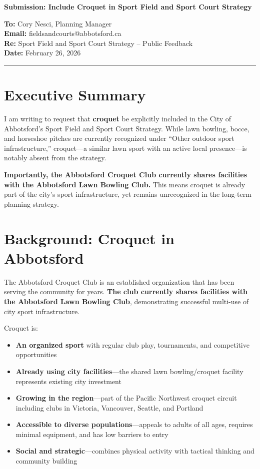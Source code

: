 \documentclass[11pt,letterpaper]{article}
\begin{document}
\begin{center}
{\Large \textbf{Submission: Include Croquet in Sport Field and Sport Court Strategy}}
\end{center}

\noindent
\textbf{To:} Cory Nesci, Planning Manager \\
\textbf{Email:} fieldsandcourts@abbotsford.ca \\
\textbf{Re:} Sport Field and Sport Court Strategy -- Public Feedback \\
\textbf{Date:} February 26, 2026

\vspace{0.5cm}
\noindent\rule{\textwidth}{0.4pt}
\vspace{0.5cm}

\section*{Executive Summary}

I am writing to request that \textbf{croquet} be explicitly included in the City of Abbotsford's Sport Field and Sport Court Strategy. While lawn bowling, bocce, and horseshoe pitches are currently recognized under ``Other outdoor sport infrastructure,'' croquet---a similar lawn sport with an active local presence---is notably absent from the strategy.

\textbf{Importantly, the Abbotsford Croquet Club currently shares facilities with the Abbotsford Lawn Bowling Club.} This means croquet is already part of the city's sport infrastructure, yet remains unrecognized in the long-term planning strategy.

\section*{Background: Croquet in Abbotsford}

The Abbotsford Croquet Club is an established organization that has been serving the community for years. \textbf{The club currently shares facilities with the Abbotsford Lawn Bowling Club}, demonstrating successful multi-use of city sport infrastructure.

Croquet is:

\begin{itemize}[leftmargin=*]
    \item \textbf{An organized sport} with regular club play, tournaments, and competitive opportunities
    \item \textbf{Already using city facilities}---the shared lawn bowling/croquet facility represents existing city investment
    \item \textbf{Growing in the region}---part of the Pacific Northwest croquet circuit including clubs in Victoria, Vancouver, Seattle, and Portland
    \item \textbf{Accessible to diverse populations}---appeals to adults of all ages, requires minimal equipment, and has low barriers to entry
    \item \textbf{Social and strategic}---combines physical activity with tactical thinking and community building
\end{itemize}
\end{document}
